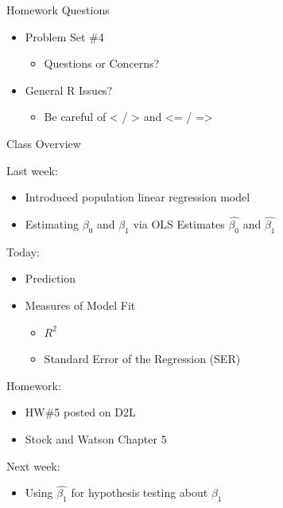\documentclass[
  8pt,
  ignorenonframetext,
  dvipsnames]{beamer}
\providecommand{\tightlist}{%
  \setlength{\itemsep}{0pt}\setlength{\parskip}{0pt}}
\let\olditem\item
\renewcommand{\item}{%
  \olditem\vspace{4pt}
}
\begin{document}
\begin{frame}{Homework Questions}
\protect\hypertarget{homework-questions}{}

\begin{itemize}
\tightlist
\item
  Problem Set \#4

  \begin{itemize}
  \tightlist
  \item
    Questions or Concerns?
  \end{itemize}
\item
  General R Issues?

  \begin{itemize}
  \tightlist
  \item
    Be careful of \textless{} / \textgreater{} and \textless= /
    =\textgreater{}
  \end{itemize}
\end{itemize}

\end{frame}

\begin{frame}{Class Overview}
\protect\hypertarget{class-overview}{}

Last week:

\begin{itemize}
\tightlist
\item
  Introduced population linear regression model
\item
  Estimating \(\beta_0\) and \(\beta_1\) via OLS Estimates
  \(\hat{\beta_0}\) and \(\hat{\beta_1}\)
\end{itemize}

\medskip

Today:

\begin{itemize}
\tightlist
\item
  Prediction
\item
  Measures of Model Fit

  \begin{itemize}
  \tightlist
  \item
    \(R^2\)
  \item
    Standard Error of the Regression (SER)
  \end{itemize}
\end{itemize}

\medskip

Homework:

\begin{itemize}
\tightlist
\item
  HW\#5 posted on D2L
\item
  Stock and Watson Chapter 5
\end{itemize}

\medskip

Next week:

\begin{itemize}
\tightlist
\item
  Using \(\hat{\beta_1}\) for hypothesis testing about \(\beta_1\)
\end{itemize}

\end{frame}
\end{document}
